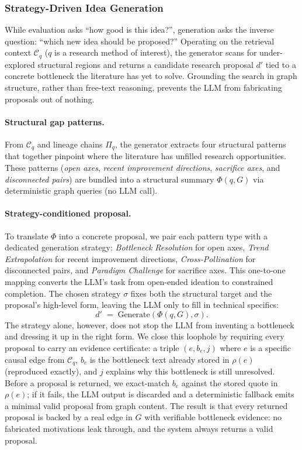 \documentclass{llmxive}
\begin{document}
\subsubsection{Strategy-Driven Idea Generation}
\label{sec:gen}

While evaluation asks ``how good is this idea?'', generation asks the inverse question: ``which new idea should be proposed?'' Operating on the retrieval context $\mathcal{C}_q$ ($q$ is a research method of interest), the generator scans for under-explored structural regions and returns a candidate research proposal $d'$ tied to a concrete bottleneck the literature has yet to solve. Grounding the search in graph structure, rather than free-text reasoning, prevents the LLM from fabricating proposals out of nothing.

\paragraph{Structural gap patterns.}
From $\mathcal{C}_q$ and lineage chains $\Pi_q$, the generator extracts four structural patterns that together pinpoint where the literature has unfilled research opportunities. These patterns (\textit{open axes}, \textit{recent improvement directions}, \textit{sacrifice axes}, and \textit{disconnected pairs}) are bundled into a structural summary $\Phi(q, G)$ via deterministic graph queries (no LLM call).

\paragraph{Strategy-conditioned proposal.}
To translate $\Phi$ into a concrete proposal, we pair each pattern type with a dedicated generation strategy: \textit{Bottleneck Resolution} for open axes, \textit{Trend Extrapolation} for recent improvement directions, \textit{Cross-Pollination} for disconnected pairs, and \textit{Paradigm Challenge} for sacrifice axes. This one-to-one mapping converts the LLM's task from open-ended ideation to constrained completion. The chosen strategy $\sigma$ fixes both the structural target and the proposal's high-level form, leaving the LLM only to fill in technical specifics:
\begin{equation}
d' \;=\; \mathrm{Generate}(\Phi(q, G), \sigma).
\label{eq:gen}
\end{equation}
The strategy alone, however, does not stop the LLM from inventing a bottleneck and dressing it up in the right form. We close this loophole by requiring every proposal to carry an evidence certificate: a triple $(e, b_e, j)$ where $e$ is a specific causal edge from $\mathcal{C}_q$, $b_e$ is the bottleneck text already stored in $\rho(e)$ (reproduced exactly), and $j$ explains why this bottleneck is still unresolved. Before a proposal is returned, we exact-match $b_e$ against the stored quote in $\rho(e)$; if it fails, the LLM output is discarded and a deterministic fallback emits a minimal valid proposal from graph content. The result is that every returned proposal is backed by a real edge in $G$ with verifiable bottleneck evidence: no fabricated motivations leak through, and the system always returns a valid proposal.
\end{document}
